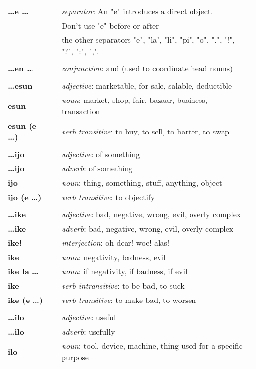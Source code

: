 \begin{supertabular}{p{2,5cm}|ll}
\textbf{\dots e \dots} && \textit{separator}: An "e" introduces a direct object. \\ && Don't use "e" before or after \\ && the other separators "e", "la", "li", "pi", "o", ".", "!", "?", ":", ",".  \\ 
 && \\ %
\textbf{\dots en \dots} && \textit{conjunction}: and (used to coordinate head nouns) \\ 
 && \\ %
\textbf{\dots esun} && \textit{adjective}: marketable, for sale, salable, deductible \\  
\textbf{esun} && \textit{noun}: market, shop, fair, bazaar, business, transaction \\ 
\textbf{esun (e \dots)} && \textit{verb transitive}: to buy, to sell, to barter, to swap \\ 
 && \\ %
\textbf{\dots ijo} && \textit{adjective}: of something \\ 
\textbf{\dots ijo} && \textit{adverb}: of something \\ 
\textbf{ijo} && \textit{noun}: thing, something, stuff, anything, object \\ 
\textbf{ijo (e \dots)} && \textit{verb transitive}: to objectify \\ 
 && \\ %
\textbf{\dots ike} && \textit{adjective}: bad, negative, wrong, evil, overly complex \\ 
\textbf{\dots ike} && \textit{adverb}: bad, negative, wrong, evil, overly complex \\ 
\textbf{ike!} && \textit{interjection}: oh dear! woe! alas! \\ 
\textbf{ike} && \textit{noun}: negativity, badness, evil \\ 
\textbf{ike la \dots} && \textit{noun}: if negativity, if badness, if evil \\ 
\textbf{ike} && \textit{verb intransitive}: to be bad, to suck \\ 
\textbf{ike (e \dots)} && \textit{verb transitive}: to make bad, to worsen \\ 
 && \\ %
\textbf{\dots ilo} && \textit{adjective}: useful \\ 
\textbf{\dots ilo} && \textit{adverb}: usefully \\ 
\textbf{ilo} && \textit{noun}: tool, device, machine, thing used for a specific purpose \\ 

\end{supertabular}
